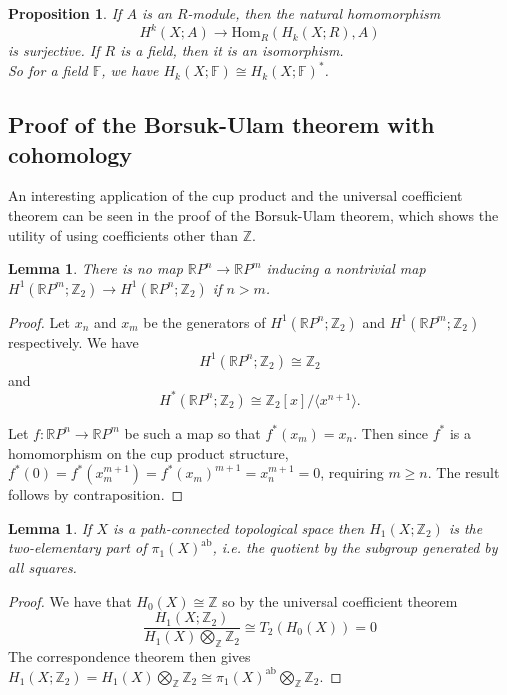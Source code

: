 \documentclass{article}
\newtheorem{lemma}[theorem]{Lemma}
\newtheorem{proposition}[theorem]{Proposition}
\begin{document}
\begin{proposition}
If $A$ is an $R$-module, then the natural homomorphism\[H^k(X;A)\to\text{Hom}_R(H_k(X;R),A)\]is surjective. If $R$ is a field, then it is an isomorphism.\\
So for a field $\mathbb{F}$, we have $H_k(X;\mathbb{F})\cong H_k(X;\mathbb{F})^*$.
\end{proposition}

\subsection{Proof of the Borsuk-Ulam theorem with cohomology}
An interesting application of the cup product and the universal coefficient theorem can be seen in the proof of the Borsuk-Ulam theorem, which shows the utility of using coefficients other than $\mathbb{Z}$.

\begin{lemma}
There is no map $\mathbb{R} P^n$$\rightarrow$$\mathbb{R} P^m$ inducing a nontrivial map $H^1(\mathbb{R} P^m;\mathbb{Z}_2)\rightarrow H^1(\mathbb{R} P^n;\mathbb{Z}_2)$ if $n>m$.
\end{lemma}
\begin{proof}
Let $x_n$ and $x_m$ be the generators of $H^1(\mathbb{R} P^n;\mathbb{Z}_2)$ and $H^1(\mathbb{R} P^m;\mathbb{Z}_2)$ respectively.
We have
\[H^1(\mathbb{R} P^n;\mathbb{Z}_2)\cong \mathbb{Z}_2\] and\[H^*(\mathbb{R} P^n;\mathbb{Z}_2)\cong \mathbb{Z}_2[x]/\langle x^{n+1}\rangle.\] 

\noindent Let $f\colon\mathbb{R} P^n\to\mathbb{R} P^m $ be such a map so that $f^*(x_m)=x_n$.
Then since $f^*$ is a homomorphism on the cup product structure, $f^*(0)=f^*(x_m^{m+1})=f^*(x_m)^{m+1}=x_n^{m+1}=0$, requiring $m \geq n$. The result follows by contraposition.
\end{proof}

\begin{lemma}
If $X$ is a path-connected topological space then $H_1(X;\mathbb{Z}_2)$ is the two-elementary part of $\pi_1(X)^{\text{ab}}$, i.e. the quotient by the subgroup generated by all squares.
\end{lemma}
\begin{proof}
We have that $H_0(X)\cong\mathbb{Z}$ so by the universal coefficient theorem \[\frac{H_1(X;\mathbb{Z}_2)}{H_1(X)\bigotimes_\mathbb{Z}\mathbb{Z}_2}\cong T_2(H_0(X))=0\] The correspondence theorem then gives $H_1(X;\mathbb{Z}_2)=H_1(X)\bigotimes_\mathbb{Z}\mathbb{Z}_2\cong\pi_1(X)^{\text{ab}}\bigotimes_\mathbb{Z}\mathbb{Z}_2$.
\end{proof}
\end{document}
